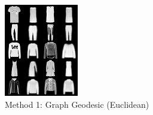 \documentclass{article}
\begin{document}
\begin{figure}[!p]
    \centering
    \begin{subfigure}[b]{0.32\textwidth}
        \includegraphics[width=\linewidth]{images/fashion_vanilla_euclidean_comparison_grid.png}
        \caption{Method 1: Graph Geodesic (Euclidean)}
        \label{fig:euclidean_recon}
    \end{subfigure}
    \hfill
    \begin{subfigure}[b]{0.32\textwidth}

\end{subfigure}
\end{figure}
\end{document}
